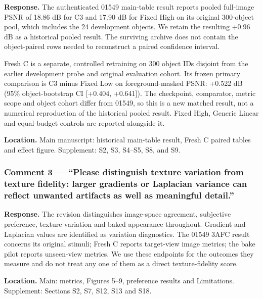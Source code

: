 \documentclass[
]{article}
\begin{document}
\textbf{Response.} The authenticated 01549 main-table result reports
pooled full-image PSNR of 18.86 dB for C3 and 17.90 dB for Fixed High on
its original 300-object pool, which includes the 24 development objects.
We retain the resulting +0.96 dB as a historical pooled result. The
surviving archive does not contain the object-paired rows needed to
reconstruct a paired confidence interval.

Fresh C is a separate, controlled retraining on 300 object IDs disjoint
from the earlier development probe and original evaluation cohort. Its
frozen primary comparison is C3 minus Fixed Low on foreground-masked
PSNR: +0.522 dB (95\% object-bootstrap CI {[}+0.404, +0.641{]}). The
checkpoint, comparator, metric scope and object cohort differ from
01549, so this is a new matched result, not a numerical reproduction of
the historical pooled result. Fixed High, Generic Linear and
equal-budget controls are reported alongside it.

\textbf{Location.} Main manuscript: historical main-table result, Fresh
C paired tables and effect figure. Supplement: S2, S3, S4--S5, S8, and
S9.

\hypertarget{comment-3-please-distinguish-texture-variation-from-texture-fidelity-larger-gradients-or-laplacian-variance-can-reflect-unwanted-artifacts-as-well-as-meaningful-detail.}{%
\subsubsection{Comment 3 --- ``Please distinguish texture variation from
texture fidelity: larger gradients or Laplacian variance can reflect
unwanted artifacts as well as meaningful
detail.''}\label{comment-3-please-distinguish-texture-variation-from-texture-fidelity-larger-gradients-or-laplacian-variance-can-reflect-unwanted-artifacts-as-well-as-meaningful-detail.}}

\textbf{Response.} The revision distinguishes image-space agreement,
subjective preference, texture variation and baked appearance
throughout. Gradient and Laplacian values are identified as variation
diagnostics. The 01549 3AFC result concerns its original stimuli; Fresh
C reports target-view image metrics; the bake pilot reports unseen-view
metrics. We use these endpoints for the outcomes they measure and do not
treat any one of them as a direct texture-fidelity score.

\textbf{Location.} Main: metrics, Figures 5--9, preference results and
Limitations. Supplement: Sections S2, S7, S12, S13 and S18.
\end{document}
